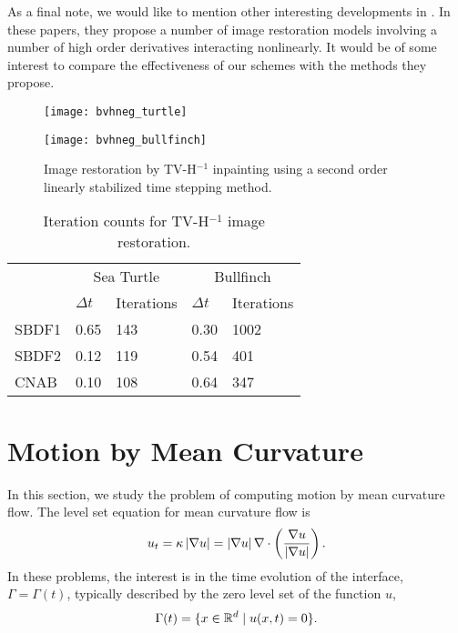 As a final note, we would like to mention other interesting developments in \cite{bredies2010total,papafitsoros2014combined,papafitsoros2013combined}. In these papers, they propose a number of image restoration models involving a number of high order derivatives interacting nonlinearly. It would be of some interest to compare the effectiveness of our schemes with the methods they propose.

\begin{figure}[htb!]
	\centering
\begin{minipage}{0.65\textwidth}
	\texttt{[image: bvhneg\_turtle]}
\end{minipage}
\begin{minipage}{0.65\textwidth}
	\texttt{[image: bvhneg\_bullfinch]}
\end{minipage}
\caption[Image restoration by TV-H$^{-1}$ inpainting.]{Image restoration by TV-H$^{-1}$ inpainting using a second order linearly stabilized time stepping method.}
\label{fig:bvhneg inpainting}
\end{figure}

\begin{table}[htb!]
\caption[Iteration counts for TV-H$^{-1}$ image restoration.]{Iteration counts for TV-H$^{-1}$ image restoration.}
        \centering\begin{tabular}{lll ll} \toprule[1.25pt]
& \multicolumn{2}{c}{Sea Turtle} & \multicolumn{2}{c}{Bullfinch}
\\
& $\Delta t$ & Iterations & $\Delta t$ & Iterations
\\ \midrule
SBDF1 & 0.65 & 143 & 0.30 & 1002
\\
SBDF2& 0.12 & 119 & 0.54 & 401 
\\             
CNAB & 0.10 & 108 & 0.64 & 347
\\ \bottomrule[1.25pt]
\end{tabular}
\label{tab:bvhneg iter counts}
\end{table}


\section{Motion by Mean Curvature}
In this section, we study the problem of computing motion by mean curvature flow. The level set equation for mean curvature flow is 
\begin{align}
        u_t 
= \kappa\left|\nabla u\right| 
= \left|\nabla u\right| \nabla \cdot \left(\frac{\nabla u}{\left|\nabla u\right|} \right).
\end{align}
In these problems, the interest is in the time evolution of the interface, $\Gamma=\Gamma(t)$, typically described by the zero level set of the function $u$,
\begin{align}
        \Gamma(t) = \{x \in \mathbb{R}^d \mid u(x,t) =0\}.
\end{align}

